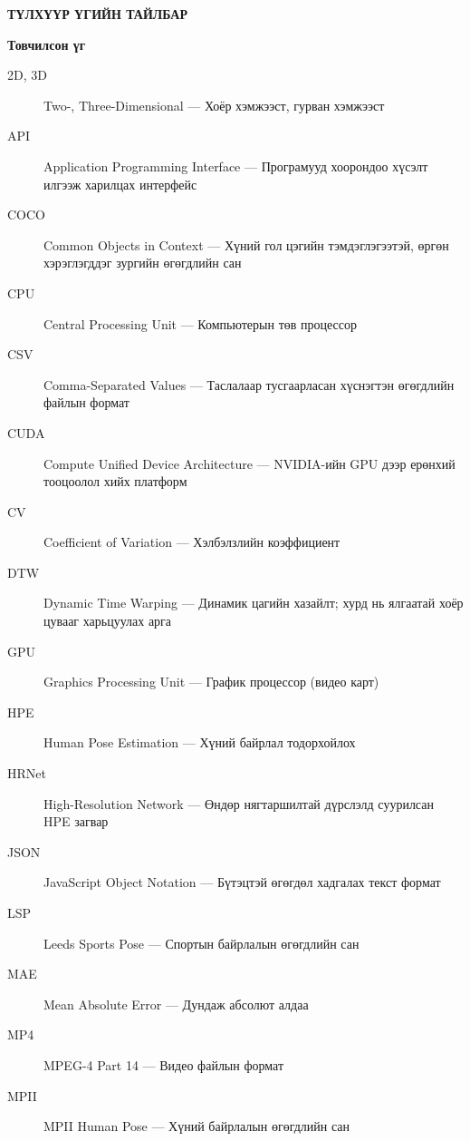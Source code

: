 \newpage
\begingroup
\renewcommand{\headrulewidth}{0pt}
\markboth{}{}
\begin{center}
\textbf{\large ТҮЛХҮҮР ҮГИЙН ТАЙЛБАР}
\end{center}

\singlespace

\noindent\textbf{Товчилсон үг}

\begin{description}
\item[2D, 3D] Two-, Three-Dimensional --- Хоёр хэмжээст, гурван хэмжээст
\item[API] Application Programming Interface --- Програмууд хоорондоо хүсэлт илгээж харилцах интерфейс
\item[COCO] Common Objects in Context --- Хүний гол цэгийн тэмдэглэгээтэй, өргөн хэрэглэгддэг зургийн өгөгдлийн сан
\item[CPU] Central Processing Unit --- Компьютерын төв процессор
\item[CSV] Comma-Separated Values --- Таслалаар тусгаарласан хүснэгтэн өгөгдлийн файлын формат
\item[CUDA] Compute Unified Device Architecture --- NVIDIA-ийн GPU дээр ерөнхий тооцоолол хийх платформ
\item[CV] Coefficient of Variation --- Хэлбэлзлийн коэффициент
\item[DTW] Dynamic Time Warping --- Динамик цагийн хазайлт; хурд нь ялгаатай хоёр цувааг харьцуулах арга
\item[GPU] Graphics Processing Unit --- График процессор (видео карт)
\item[HPE] Human Pose Estimation --- Хүний байрлал тодорхойлох
\item[HRNet] High-Resolution Network --- Өндөр нягтаршилтай дүрслэлд суурилсан HPE загвар
\item[JSON] JavaScript Object Notation --- Бүтэцтэй өгөгдөл хадгалах текст формат
\item[LSP] Leeds Sports Pose --- Спортын байрлалын өгөгдлийн сан
\item[MAE] Mean Absolute Error --- Дундаж абсолют алдаа
\item[MP4] MPEG-4 Part 14 --- Видео файлын формат
\item[MPII] MPII Human Pose --- Хүний байрлалын өгөгдлийн сан

\end{description}
